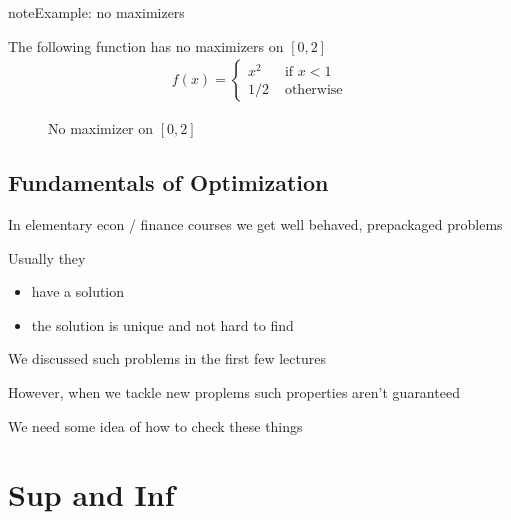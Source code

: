 \documentclass[letterpaper,10pt,english]{jupyterBook}
\begin{document}
\begin{sphinxadmonition}{note}{Example: no maximizers}

\sphinxAtStartPar
The following function has no maximizers on \([0, 2]\)
\begin{equation*}
\begin{split}
f(x) = 
\begin{cases}
x^2 &  \text{ if } x < 1
\\
1/2 &  \text{ otherwise}
\end{cases}
\end{split}
\end{equation*}
\begin{figure}[H]
\centering
\capstart

\noindent{}
\caption{No maximizer on \([0, 2]\)}\label{\detokenize{06.optimization_fundamentals:id5}}\end{figure}
\end{sphinxadmonition}


\subsection{Fundamentals of Optimization}
\label{\detokenize{06.optimization_fundamentals:id1}}
\sphinxAtStartPar
In elementary econ / finance courses we get well behaved, prepackaged problems

\sphinxAtStartPar
Usually they
\begin{itemize}
\item {} 
\sphinxAtStartPar
have a solution

\item {} 
\sphinxAtStartPar
the solution is unique and not hard to find

\end{itemize}

\sphinxAtStartPar
We discussed such problems in the first few lectures

\sphinxAtStartPar
However, when we tackle new proplems such properties aren’t guaranteed

\sphinxAtStartPar
We need some idea of how to check these things


\section{Sup and Inf}
\label{\detokenize{06.optimization_fundamentals:sup-and-inf}}
\end{document}
